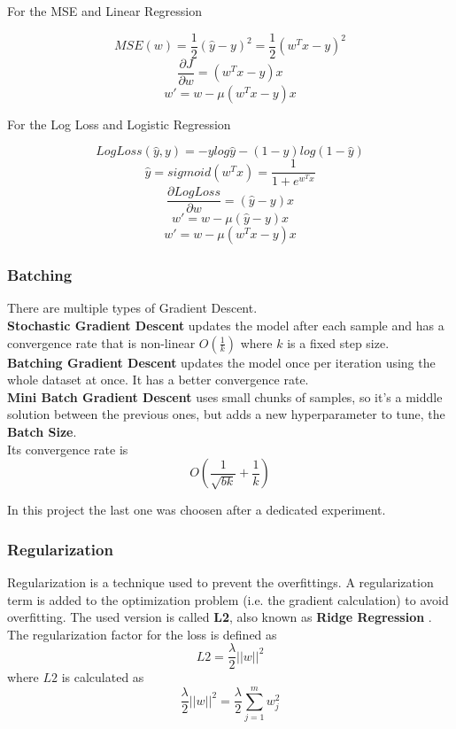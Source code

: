 \documentclass[
	letterpaper, %
	10pt, %
]{class}
\begin{document}
For the MSE and Linear Regression

$$ MSE(w) = \frac{1}{2} (\hat{y} - y)^2 = \frac{1}{2} (w^Tx - y)^2 $$
$$\frac{\partial J}{\partial w} = (w^T x - y)x $$
$$ w' = w - \mu (w^T x -y)x $$

For the Log Loss and Logistic Regression

$$ LogLoss(\hat{y}, y) = -y log \hat{y} - (1-y)log(1- \hat{y})$$
$$ \hat{y} = sigmoid(w^Tx) = \frac{1}{1 + e^{w^Tx}} $$
$$ \frac{\partial LogLoss}{\partial w} = (\hat{y} - y)x $$
$$ w' = w - \mu (\hat{y} - y)x $$
$$ w' = w - \mu (w^T x -y)x $$

\subsubsection{Batching}
There are multiple types of Gradient Descent.\\

\textbf{Stochastic Gradient Descent} updates the model after each sample and has a convergence rate that is non-linear $O(\frac{1}{k})$ where $k$ is a fixed step size.\\

\textbf{Batching Gradient Descent} updates the model once per iteration using the whole dataset at once. It has a better convergence rate.\\

\textbf{Mini Batch Gradient Descent} \cite{batching} uses small chunks of samples, so it's a middle solution between the previous ones, but adds a new hyperparameter to tune, the \textbf{Batch Size}.\\
Its convergence rate is
$$O(\frac{1}{\sqrt{bk}} + \frac{1}{k})$$

In this project the last one was choosen after a dedicated experiment.

\subsubsection{Regularization}
Regularization is a technique used to prevent the overfittings. A regularization term is added to the optimization problem (i.e. the gradient calculation) to avoid overfitting.
The used version is called \textbf{L2}, also known as \textbf{Ridge Regression} \cite{l2}.\\

The regularization factor for the loss is defined as
$$ L2 = \frac{\lambda}{2}||w||^2 $$
where $L2$ is calculated as
$$ \frac{\lambda}{2}||w||^2 = \frac{\lambda}2{\displaystyle\sum_{j=1}^m w_j^2} $$ \\
\end{document}
